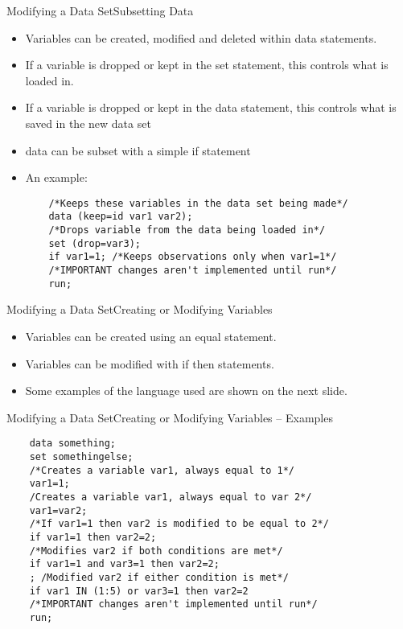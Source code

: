 \documentclass{beamer}
\begin{document}
\begin{frame}[fragile]{Modifying a Data Set}{Subsetting Data}
\begin{itemize}
    \item Variables can be created, modified and deleted within data statements.
    \item If a variable is dropped or kept in the set statement, this controls what is loaded in.
    \item If a variable is dropped or kept in the data statement, this controls what is saved in the new data set
    \item data can be subset with a simple if statement
    \item An example:
    \begin{small}
    \begin{verbatim}
    /*Keeps these variables in the data set being made*/
    data (keep=id var1 var2); 
    /*Drops variable from the data being loaded in*/
    set (drop=var3); 
    if var1=1; /*Keeps observations only when var1=1*/
    /*IMPORTANT changes aren't implemented until run*/
    run; 
    \end{verbatim}
    \end{small}
\end{itemize}

\end{frame}
\begin{frame}[fragile]{Modifying a Data Set}{Creating or Modifying Variables}
\begin{itemize}
    \item Variables can be created using an equal statement.
    \item Variables can be modified with if then statements.
    \item Some examples of the language used are shown on the next slide.
    \end{itemize}
    \end{frame}
    
    \begin{frame}[fragile]{Modifying a Data Set}{Creating or Modifying Variables -- Examples}
    \begin{verbatim}
    data something;
    set somethingelse;
    /*Creates a variable var1, always equal to 1*/
    var1=1; 
    /Creates a variable var1, always equal to var 2*/
    var1=var2; 
    /*If var1=1 then var2 is modified to be equal to 2*/
    if var1=1 then var2=2; 
    /*Modifies var2 if both conditions are met*/
    if var1=1 and var3=1 then var2=2; 
    ; /Modified var2 if either condition is met*/
    if var1 IN (1:5) or var3=1 then var2=2
    /*IMPORTANT changes aren't implemented until run*/
    run; 
    \end{verbatim}
\end{frame}
\end{document}
